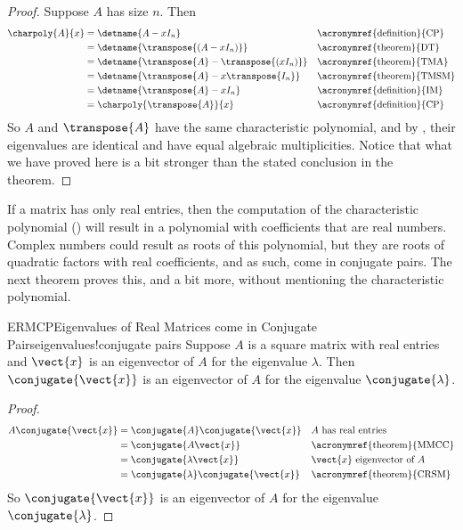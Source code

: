 %
\begin{proof}
%
Suppose $A$ has size $n$.  Then
%
\begin{align*}
\charpoly{A}{x}
&=\detname{A-xI_n}&&\text{\acronymref{definition}{CP}}\\
&=\detname{\transpose{\left(A-xI_n\right)}}&&\text{\acronymref{theorem}{DT}}\\
&=\detname{\transpose{A}-\transpose{\left(xI_n\right)}}&&\text{\acronymref{theorem}{TMA}}\\
&=\detname{\transpose{A}-x\transpose{I_n}}&&\text{\acronymref{theorem}{TMSM}}\\
&=\detname{\transpose{A}-xI_n}&&\text{\acronymref{definition}{IM}}\\
&=\charpoly{\transpose{A}}{x}&&\text{\acronymref{definition}{CP}}\\
%
\end{align*}
%
So $A$ and $\transpose{A}$ have the same characteristic polynomial, and by , their eigenvalues are identical and have equal algebraic multiplicities.  Notice that what we have proved here is a bit stronger than the stated conclusion in the theorem.
%
\end{proof}
%
If a matrix has only real entries, then the computation of the characteristic polynomial () will result in a polynomial with coefficients that are real numbers.  Complex numbers could result as roots of this polynomial, but they are roots of quadratic factors with real coefficients, and as such, come in conjugate pairs.  The next theorem proves this, and a bit more, without mentioning the characteristic polynomial.
%
\begin{theorem}{ERMCP}{Eigenvalues of Real Matrices come in Conjugate Pairs}{eigenvalues!conjugate pairs}
Suppose $A$ is a square matrix with real entries and $\vect{x}$ is an eigenvector of $A$ for the eigenvalue $\lambda$.  Then $\conjugate{\vect{x}}$ is an eigenvector of $A$ for the eigenvalue $\conjugate{\lambda}$.
\end{theorem}
%
\begin{proof}
%
\begin{align*}
A\conjugate{\vect{x}}&=\conjugate{A}\conjugate{\vect{x}}&&\text{$A$ has real entries}\\
&=\conjugate{A\vect{x}}&&\text{\acronymref{theorem}{MMCC}}\\
&=\conjugate{\lambda\vect{x}}&&\text{$\vect{x}$ eigenvector of $A$}\\
&=\conjugate{\lambda}\conjugate{\vect{x}}&&\text{\acronymref{theorem}{CRSM}}
\end{align*}
%
So $\conjugate{\vect{x}}$ is an eigenvector of $A$ for the eigenvalue $\conjugate{\lambda}$.
%
\end{proof}

